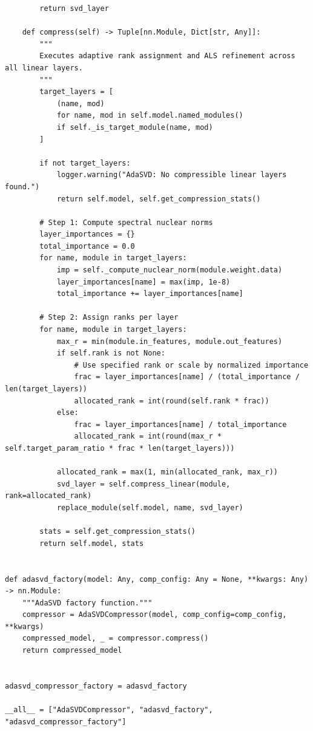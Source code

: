 \begin{lstlisting}
        return svd_layer

    def compress(self) -> Tuple[nn.Module, Dict[str, Any]]:
        """
        Executes adaptive rank assignment and ALS refinement across all linear layers.
        """
        target_layers = [
            (name, mod)
            for name, mod in self.model.named_modules()
            if self._is_target_module(name, mod)
        ]

        if not target_layers:
            logger.warning("AdaSVD: No compressible linear layers found.")
            return self.model, self.get_compression_stats()

        # Step 1: Compute spectral nuclear norms
        layer_importances = {}
        total_importance = 0.0
        for name, module in target_layers:
            imp = self._compute_nuclear_norm(module.weight.data)
            layer_importances[name] = max(imp, 1e-8)
            total_importance += layer_importances[name]

        # Step 2: Assign ranks per layer
        for name, module in target_layers:
            max_r = min(module.in_features, module.out_features)
            if self.rank is not None:
                # Use specified rank or scale by normalized importance
                frac = layer_importances[name] / (total_importance / len(target_layers))
                allocated_rank = int(round(self.rank * frac))
            else:
                frac = layer_importances[name] / total_importance
                allocated_rank = int(round(max_r * self.target_param_ratio * frac * len(target_layers)))

            allocated_rank = max(1, min(allocated_rank, max_r))
            svd_layer = self.compress_linear(module, rank=allocated_rank)
            replace_module(self.model, name, svd_layer)

        stats = self.get_compression_stats()
        return self.model, stats


def adasvd_factory(model: Any, comp_config: Any = None, **kwargs: Any) -> nn.Module:
    """AdaSVD factory function."""
    compressor = AdaSVDCompressor(model, comp_config=comp_config, **kwargs)
    compressed_model, _ = compressor.compress()
    return compressed_model


adasvd_compressor_factory = adasvd_factory

__all__ = ["AdaSVDCompressor", "adasvd_factory", "adasvd_compressor_factory"]
\end{lstlisting}
